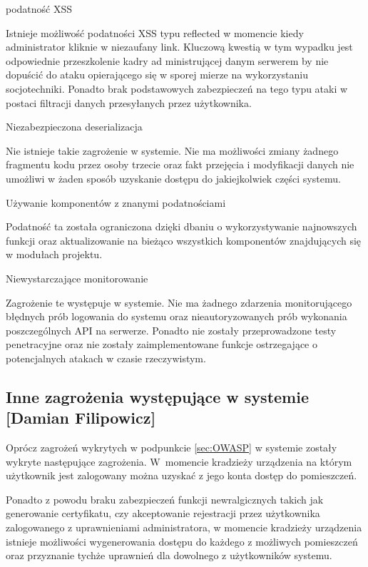 \documentclass[twoside,10pt]{article}
\def\StudentB     {Damian Filipowicz}
\begin{document}
\begin{enumerate*}
\item podatność XSS

Istnieje możliwość podatności XSS typu reflected w momencie kiedy administrator kliknie w niezaufany link. Kluczową kwestią w tym wypadku jest odpowiednie przeszkolenie kadry ad ministrującej danym serwerem by nie dopuścić do ataku opierającego się w sporej mierze na wykorzystaniu socjotechniki. Ponadto brak podstawowych zabezpieczeń na tego typu ataki w postaci filtracji danych przesyłanych przez użytkownika. 

\item Niezabezpieczona deserializacja

Nie istnieje takie zagrożenie w systemie. Nie ma możliwości zmiany żadnego fragmentu kodu przez osoby trzecie oraz fakt przejęcia i modyfikacji danych nie umożliwi w żaden sposób uzyskanie dostępu do jakiejkolwiek części systemu.

\item  Używanie komponentów z znanymi podatnościami

Podatność ta została ograniczona dzięki dbaniu o wykorzystywanie najnowszych funkcji oraz aktualizowanie na bieżąco wszystkich komponentów znajdujących się w modułach projektu.

\item Niewystarczające monitorowanie 

Zagrożenie te występuje w systemie. Nie ma żadnego zdarzenia monitorującego błędnych prób logowania do systemu oraz nieautoryzowanych prób wykonania poszczególnych API na serwerze. Ponadto nie zostały przeprowadzone testy penetracyjne oraz nie zostały zaimplementowane funkcje ostrzegające o potencjalnych atakach w czasie rzeczywistym\cite{OWASP}.
\end{enumerate*}

\newpage
\subsection{Inne zagrożenia występujące w systemie [\StudentB]}

Oprócz zagrożeń wykrytych w podpunkcie \ref{sec:OWASP} w systemie zostały wykryte następujące zagrożenia. W~momencie kradzieży urządzenia na którym użytkownik jest zalogowany można uzyskać z jego konta dostęp do pomieszczeń.

Ponadto z powodu braku zabezpieczeń funkcji newralgicznych takich jak generowanie certyfikatu, czy akceptowanie rejestracji przez użytkownika zalogowanego z uprawnieniami administratora, w momencie kradzieży urządzenia istnieje możliwości wygenerowania dostępu do każdego z możliwych pomieszczeń oraz przyznanie tychże uprawnień dla dowolnego z użytkowników systemu. 
\end{document}
